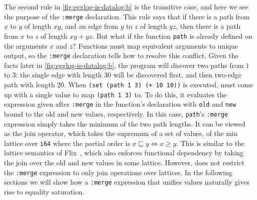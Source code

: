 The second rule in \autoref{fig:egglog-is-datalog:b}
 is the transitive case,
 and here we see the purpose of the \lstinline{:merge} declaration.
This rule says that if there is a path from $x$ to $y$ of length $xy$,
 and an edge from $y$ to $z$ of length $yz$,
 then there is a path from $x$ to $z$ of length $xy + yz$.
But what if the function \lstinline{path} is already defined
 on the arguments $x$ and $z$?
Functions must map equivalent arguments to unique output,
 so the \lstinline{:merge} declaration tells \egglog 
 how to resolve this conflict.
Given the facts later in \autoref{fig:egglog-is-datalog:b},
 the program will discover two paths from $1$ to $3$:
 the single edge with length $30$ 
 will be discovered first,
 and then two-edge path with length $20$.
When \lstinline{(set (path 1 3) (+ 10 10))} 
 is executed,
 \egglog must come up with a single value to map \lstinline{(path 1 3)} to.
To do this,
 it evaluates the expression given after \lstinline{:merge} 
 in the function's declaration
 with \lstinline{old} and \lstinline{new} bound to the old and new values,
 respectively.
In this case,
 \lstinline{path}'s \lstinline{:merge} expression
 simply takes the minimum of the two path lengths.
It can be viewed as the join operator,
 which takes the supremum of a set of values, 
 of the min lattice over \lstinline{i64} 
 where the partial order is $x\sqsubseteq y\iff x\geq y$.
This is similar to the lattice semantics of Flix~\citep{flix},
 which also enforces functional dependency by taking the join
 over the old and new values in some lattice.
However, \egglog does not restrict the \lstinline{:merge} expression
 to only join operations over lattices.
In the following sections we will show how a \lstinline{:merge} expression
 that unifies values naturally gives rise to equality saturation.


